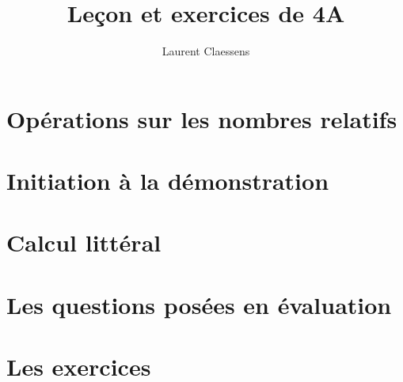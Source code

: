 \documentclass[a4paper,10pt]{book}
\begin{document}

\thispagestyle{empty}

\title{Leçon et exercices de 4A}
\author{Laurent Claessens}
\maketitle

\newpage

\tableofcontents


\chapter{Opérations sur les nombres relatifs}


\chapter{Initiation à la démonstration}


\chapter{Calcul littéral}


\chapter{Les questions posées en évaluation}


\chapter{Les exercices}





\end{document}
